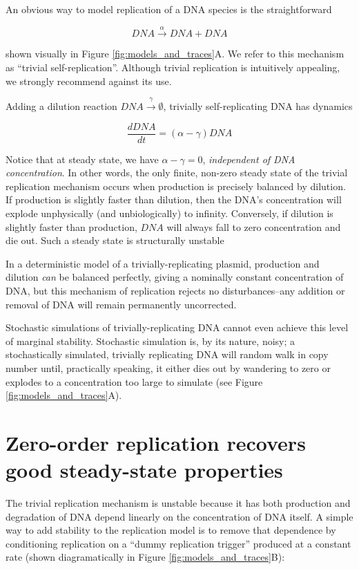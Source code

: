 \documentclass[journal = jacsat,manuscript = note]{achemso}
\begin{document}
An obvious way to model replication of a DNA species is the straightforward 

$$\mathit{DNA} \overset{\alpha}{\to} \mathit{DNA} + \mathit{DNA}$$

\noindent shown visually in Figure \ref{fig:models_and_traces}A. We refer to this mechanism as ``trivial self-replication''. Although trivial replication is intuitively appealing, we strongly recommend against its use. 

Adding a dilution reaction $\mathit{DNA} \overset{\gamma}{\to} \emptyset$, trivially self-replicating DNA has dynamics

$$\frac{d\mathit{DNA}}{dt} = (\alpha - \gamma) \mathit{DNA}$$

Notice that at steady state, we have $\alpha - \gamma = 0$, \emph{independent of DNA concentration}. In other words, the only finite, non-zero steady state of the trivial replication mechanism occurs when production is precisely balanced by dilution. If production is slightly faster than dilution, then the DNA's concentration will explode unphysically (and unbiologically) to infinity. Conversely, if dilution is slightly faster than production, $\mathit{DNA}$ will always fall to zero concentration and die out. Such a steady state is structurally unstable

In a deterministic model of a trivially-replicating plasmid, production and dilution \emph{can} be balanced perfectly, giving a nominally constant concentration of DNA, but this mechanism of replication rejects no disturbances--any addition or removal of DNA will remain permanently uncorrected.

Stochastic simulations of trivially-replicating DNA cannot even achieve this level of marginal stability. Stochastic simulation is, by its nature, noisy; a stochastically simulated, trivially replicating DNA will random walk in copy number until, practically speaking, it either dies out by wandering to zero or explodes to a concentration too large to simulate (see Figure \ref{fig:models_and_traces}A).

\section{Zero-order replication recovers good steady-state properties}

The trivial replication mechanism is unstable because it has both production and degradation of DNA depend linearly on the concentration of DNA itself. A simple way to add stability to the replication model is to remove that dependence by conditioning replication on a ``dummy replication trigger'' produced at a constant rate (shown diagramatically in Figure \ref{fig:models_and_traces}B):
\end{document}
